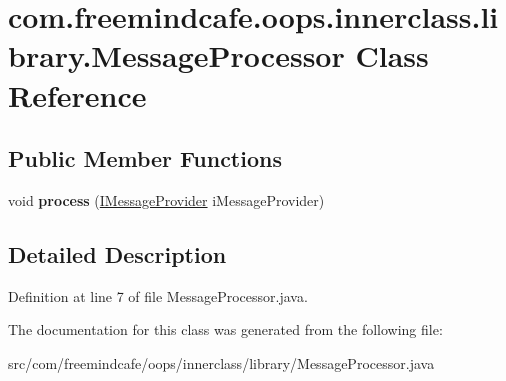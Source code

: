\hypertarget{classcom_1_1freemindcafe_1_1oops_1_1innerclass_1_1library_1_1_message_processor}{}\section{com.\+freemindcafe.\+oops.\+innerclass.\+library.\+Message\+Processor Class Reference}
\label{classcom_1_1freemindcafe_1_1oops_1_1innerclass_1_1library_1_1_message_processor}
\subsection*{Public Member Functions}
\begin{DoxyCompactItemize}
\item 
\hypertarget{classcom_1_1freemindcafe_1_1oops_1_1innerclass_1_1library_1_1_message_processor_a465b70dfb6cd7fed44deabdbff932482}{}void {\bfseries process} (\hyperlink{interfacecom_1_1freemindcafe_1_1oops_1_1innerclass_1_1library_1_1_i_message_provider}{I\+Message\+Provider} i\+Message\+Provider)\label{classcom_1_1freemindcafe_1_1oops_1_1innerclass_1_1library_1_1_message_processor_a465b70dfb6cd7fed44deabdbff932482}

\end{DoxyCompactItemize}


\subsection{Detailed Description}


Definition at line 7 of file Message\+Processor.\+java.



The documentation for this class was generated from the following file\+:\begin{DoxyCompactItemize}
\item 
src/com/freemindcafe/oops/innerclass/library/Message\+Processor.\+java\end{DoxyCompactItemize}
